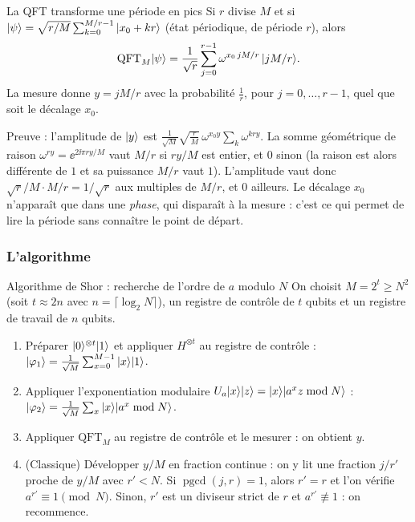 \begin{resultat}{La QFT transforme une période en pics}
Si $r$ divise $M$ et si $|\psi\rangle=\sqrt{r/M}\sum_{k=0}^{M/r-1}|x_0+kr\rangle$ (état périodique, de période
$r$), alors
\[
  \mathrm{QFT}_M|\psi\rangle=\frac{1}{\sqrt r}\sum_{j=0}^{r-1}\omega^{x_0\,jM/r}\,|jM/r\rangle.
\]
La mesure donne $y=jM/r$ avec la probabilité $\frac1r$, pour $j=0,\ldots,r-1$, quel que soit le décalage $x_0$.
\end{resultat}

Preuve : l'amplitude de $|y\rangle$ est $\frac{1}{\sqrt M}\sqrt{\frac rM}\,\omega^{x_0y}\sum_{k}\omega^{kry}$.
La somme géométrique de raison $\omega^{ry}=\ee^{2\ii\pi ry/M}$ vaut $M/r$ si $ry/M$ est entier, et $0$ sinon
(la raison est alors différente de $1$ et sa puissance $M/r$ vaut $1$). L'amplitude vaut donc
$\sqrt{r}/M\cdot M/r=1/\sqrt r$ aux multiples de $M/r$, et $0$ ailleurs. Le décalage $x_0$ n'apparaît que dans une
\emph{phase}, qui disparaît à la mesure : c'est ce qui permet de lire la période sans connaître le point de départ.

\subsubsection{L'algorithme}

\begin{resultat}{Algorithme de Shor : recherche de l'ordre de $a$ modulo $N$}
On choisit $M=2^t\geq N^2$ (soit $t\approx2n$ avec $n=\lceil\log_2N\rceil$), un registre de contrôle de $t$ qubits et un
registre de travail de $n$ qubits.
\begin{enumerate}[nosep]
  \item Préparer $|0\rangle^{\otimes t}|1\rangle$ et appliquer $H^{\otimes t}$ au registre de contrôle :
        $|\varphi_1\rangle=\frac{1}{\sqrt M}\sum_{x=0}^{M-1}|x\rangle|1\rangle$.
  \item Appliquer l'exponentiation modulaire $U_a|x\rangle|z\rangle=|x\rangle|a^xz\bmod N\rangle$ :
        $|\varphi_2\rangle=\frac{1}{\sqrt M}\sum_{x}|x\rangle|a^x\bmod N\rangle$.
  \item Appliquer $\mathrm{QFT}_M$ au registre de contrôle et le mesurer : on obtient $y$.
  \item (Classique) Développer $y/M$ en fraction continue : on y lit une fraction $j/r'$ proche de
        $y/M$ avec $r'<N$. Si $\operatorname{pgcd}(j,r)=1$, alors $r'=r$ et l'on vérifie $a^{r'}\equiv1\pmod N$.
        Sinon, $r'$ est un diviseur strict de $r$ et $a^{r'}\not\equiv1$ : on recommence.
\end{enumerate}
\end{resultat}

